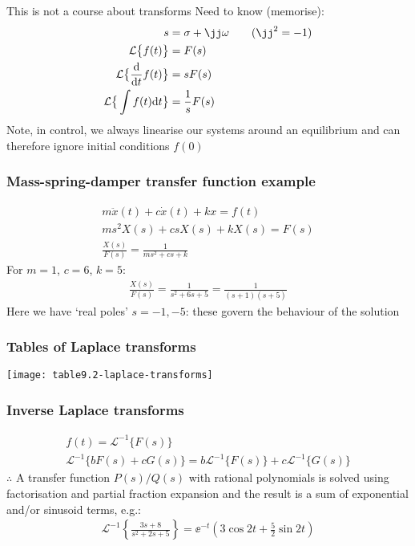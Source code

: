 \documentclass{beamer-control}
\begin{document}
\begin{frame}{This is not a course about transforms}
  Need to know (memorise):
  \begin{align}
  s &= \sigma+\jj\ww \qquad (\jj^2=-1) \\
  \mathcal{L}\bigl\{f(t)\bigr\} &= F(s) \\
  \mathcal{L}\bigl\{\Deriv{}{t}f(t)\bigr\} &= sF(s)  \\
  \mathcal{L}\bigr\{\int f(t)\dee t\bigr\} &= \frac{1}{s}F(s)
  \end{align}
  Note, in control, we always linearise our systems around an equilibrium and can therefore ignore initial conditions $f(0)$
\end{frame}

\begin{frame}
\frametitle{Mass-spring-damper transfer function example}
\begin{gather}
m \ddot x(t) + c \dot x(t) + kx = f(t) \\
m s^2 X(s) + c s X(s) + k X(s) = F(s) \\
\frac{X(s)}{F(s)} = \frac{1}{ms^2+cs+k}
\end{gather}
For $m=1$, $c=6$, $k=5$:
  \begin{gather}
\frac{X(s)}{F(s)} = \frac{1}{s^2+6s+5} = \frac{1}{(s+1)(s+5)}
  \end{gather}
Here we have `real poles' $s=-1, -5$: these govern the behaviour of the solution
\end{frame}

\begin{frame}
\frametitle{Tables of Laplace transforms}
  \centering
  \texttt{[image: table9.2-laplace-transforms]}
\end{frame}

\begin{frame}
\frametitle{Inverse Laplace transforms}
  \begin{gather}
    f(t) = \mathcal{L}^{-1}\bigl\{F(s)\bigr\} \\
    \mathcal{L}^{-1}\bigl\{b F(s) + c G(s)\bigr\} = b\mathcal{L}^{-1}\bigl\{F(s)\bigr\} + c\mathcal{L}^{-1}\bigl\{G(s)\bigr\}
  \end{gather}
  $\therefore$ A transfer function $P(s)/Q(s)$ with rational polynomials is solved using factorisation and partial fraction expansion and the result is a sum of exponential and/or sinusoid terms, e.g.:
  \begin{gather}
    \mathcal{L}^{-1}\left\{ \frac{3s+8}{s^2+2s+5} \right\} = \ee^{-t} \left( 3\cos 2t + \tfrac{5}{2}\sin 2t \right)
  \end{gather}
\end{frame}
\end{document}
